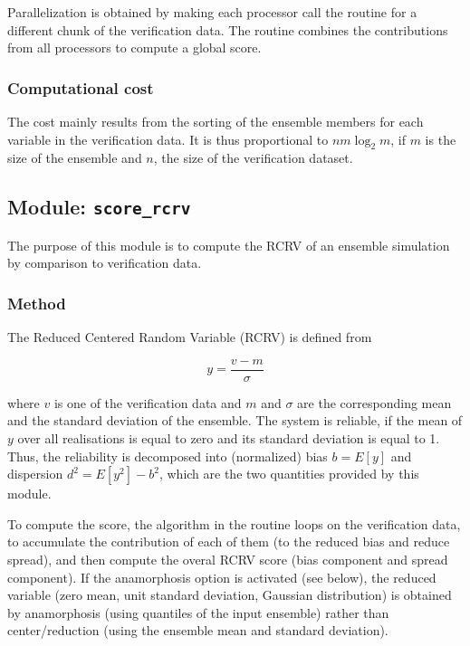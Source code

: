 \documentclass[11pt]{article}
\begin{document}
Parallelization is obtained by making each processor call the routine
for a different chunk of the verification data.
The routine combines the contributions from all processors
to compute a global score.

\subsubsection*{Computational cost}

The cost mainly results from the sorting of the ensemble members
for each variable in the verification data.
It is thus proportional to $n m \log_2 m$,
if $m$ is the size of the ensemble and $n$, the size of the verification dataset.

\subsection{Module: {\tt\bf score\_rcrv}}

The purpose of this module is to compute the RCRV
of an ensemble simulation by comparison to verification data.

\subsubsection*{Method}

The Reduced Centered Random Variable (RCRV) is defined from

\begin{equation}
 \label{eq:rcrv}
  y = \frac{v-m}{\sigma}
\end{equation}

\noindent
where $v$  is one of the verification data and
$m$ and $\sigma$ are the corresponding mean and the standard deviation of the ensemble.
The system is reliable, if the mean of $y$ over all realisations
is equal to zero and its standard deviation is equal to 1.
Thus, the reliability is decomposed into (normalized) bias $b=E[y]$
and dispersion $d^2=E[y^2]-b^2$, which are the two quantities
provided by this module.

To compute the score, the algorithm in the routine loops on the verification data,
to accumulate the contribution of each of them
(to the reduced bias and reduce spread),
and then compute the overal RCRV score
(bias component and spread component).
If the anamorphosis option is activated (see below),
the reduced variable (zero mean, unit standard deviation, Gaussian distribution)
is obtained by anamorphosis (using quantiles of the input ensemble)
rather than center/reduction (using the ensemble mean and standard deviation).
\end{document}
